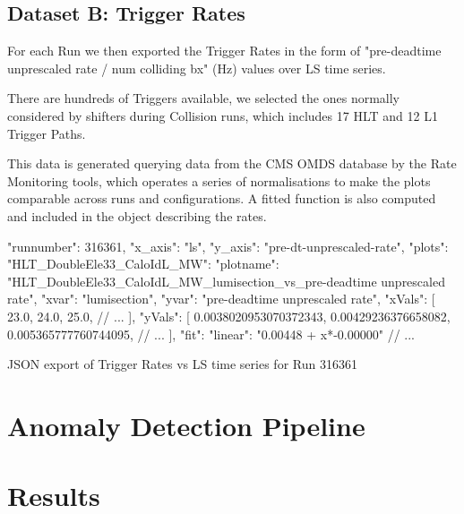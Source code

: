\subsection{Dataset B: Trigger Rates}

For each Run we then exported the Trigger Rates in the form of "pre-deadtime unprescaled rate / num colliding bx" (Hz) values over LS time series.

There are hundreds of Triggers available, we selected the ones normally considered by shifters during Collision runs, which includes 17 HLT and 12 L1 Trigger Paths.

This data is generated querying data from the CMS OMDS database by the Rate Monitoring tools, which operates a series of normalisations to make the plots comparable across runs and configurations. A fitted function is also computed and included in the object describing the rates.

\begin{listing}[H]
\begin{jsoncode}
{
    "runnumber": 316361,
    "x_axis": "ls",
    "y_axis": "pre-dt-unprescaled-rate",
    "plots": {
        "HLT_DoubleEle33_CaloIdL_MW": {
            "plotname": "HLT_DoubleEle33_CaloIdL_MW_lumisection_vs_pre-deadtime unprescaled rate",
            "xvar": "lumisection",
            "yvar": "pre-deadtime unprescaled rate",
            "xVals": [
                23.0,
                24.0,
                25.0,
                // ...
            ],
            "yVals": [
                0.0038020953070372343,
                0.00429236376658082,
                0.005365777760744095,
                // ...
            ],
            "fit": {
                "linear": "0.00448 + x*-0.00000"
            }
        }
        // ...
    }
}

\end{jsoncode}
\caption{JSON export of Trigger Rates vs LS time series for Run 316361}
\end{listing}

\section{Anomaly Detection Pipeline}

\section{Results}